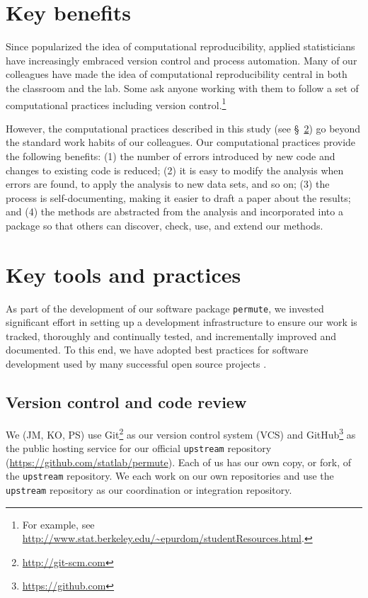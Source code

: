\documentclass[]{article}
\begin{document}
\section{Key benefits}\label{key-benefits}

Since \citet{buckheit1995wavelab} popularized the idea of computational
reproducibility, applied statisticians have increasingly embraced version control
and process automation.
Many of our colleagues have made the idea of computational reproducibility
central in both the classroom and the lab.
Some ask anyone working with them to follow a set of computational practices
including version control.\footnote{
  For example, see
  \url{http://www.stat.berkeley.edu/~epurdom/studentResources.html}.
}

However, the computational practices described in this study
(see \S~\ref{key-tools}) go beyond the standard work habits of our colleagues.
Our computational practices provide the following benefits:
(1) the number of errors introduced by new code and changes to existing code
    is reduced;
(2) it is easy to modify the analysis when errors are found, to apply the
    analysis to new data sets, and so on;
(3) the process is self-documenting, making it easier to draft a paper about
    the results; and
(4) the methods are abstracted from the analysis and incorporated into a
    package so that others can discover, check, use, and extend our methods.

\section{Key tools and practices}\label{key-tools}

As part of the development of our software package \texttt{permute}, we
invested significant effort in setting up a development infrastructure to
ensure our work is tracked, thoroughly and continually tested, and
incrementally improved and documented.
To this end, we have adopted best practices for software development used by
many successful open source projects \citep{millman2014developing}.

\subsection{\label{sec:vc}Version control and code review}

We (JM, KO, PS) use Git\footnote{\url{http://git-scm.com}} as our version
control system (VCS) and GitHub\footnote{\url{https://github.com}} as the
public hosting service for our official \texttt{upstream} repository
(\url{https://github.com/statlab/permute}).
Each of us has our own copy, or fork, of the \texttt{upstream} repository.
We each work on our own repositories and use the \texttt{upstream} repository
as our coordination or integration repository.
\end{document}
